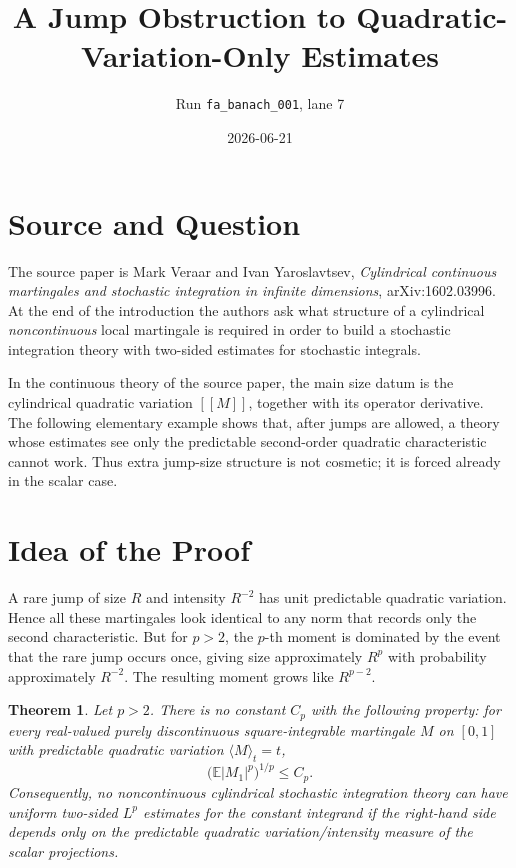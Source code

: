 \documentclass[11pt]{article}
\title{A Jump Obstruction to Quadratic-Variation-Only Estimates}
\author{Run \texttt{fa\_banach\_001}, lane 7}
\date{2026-06-21}
\newtheorem{theorem}{Theorem}
\newcommand{\E}{\mathbb E}
\begin{document}
\maketitle

\section*{Source and Question}

The source paper is Mark Veraar and Ivan Yaroslavtsev,
\emph{Cylindrical continuous martingales and stochastic integration in
infinite dimensions}, arXiv:1602.03996.  At the end of the introduction the
authors ask what structure of a cylindrical \emph{noncontinuous} local
martingale is required in order to build a stochastic integration theory with
two-sided estimates for stochastic integrals.

In the continuous theory of the source paper, the main size datum is the
cylindrical quadratic variation \( [[M]] \), together with its operator
derivative.  The following elementary example shows that, after jumps are
allowed, a theory whose estimates see only the predictable second-order
quadratic characteristic cannot work.  Thus extra jump-size structure is not
cosmetic; it is forced already in the scalar case.

\section*{Idea of the Proof}

A rare jump of size \(R\) and intensity \(R^{-2}\) has unit predictable
quadratic variation.  Hence all these martingales look identical to any norm
that records only the second characteristic.  But for \(p>2\), the \(p\)-th
moment is dominated by the event that the rare jump occurs once, giving size
approximately \(R^p\) with probability approximately \(R^{-2}\).  The resulting
moment grows like \(R^{p-2}\).

\begin{theorem}
Let \(p>2\).  There is no constant \(C_p\) with the following property:
for every real-valued purely discontinuous square-integrable martingale \(M\)
on \([0,1]\) with predictable quadratic variation \(\langle M\rangle_t=t\),
\[
   \bigl(\E |M_1|^p\bigr)^{1/p} \leq C_p .
\]
Consequently, no noncontinuous cylindrical stochastic integration theory can
have uniform two-sided \(L^p\) estimates for the constant integrand if the
right-hand side depends only on the predictable quadratic variation/intensity
measure of the scalar projections.
\end{theorem}
\end{document}
